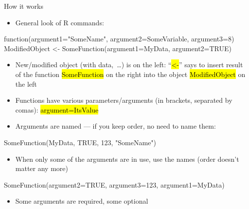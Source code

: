 \documentclass[compress, ucs, xelatex, 11pt, xcolor=svgnames,
	hyperref={
		bookmarks=true,
		unicode=true,
		colorlinks=true,
		pdftitle={Molecular data in R},
		plainpages=false,
		pdfauthor={Vojtech Zeisek},
		pdfsubject={Course about phylogeny and evolution in R},
		pdfcreator={XeLaTeX},
		pdfkeywords={R, evolution, phylogeny, molecular data},
		linkcolor=Tomato,
		anchorcolor=SaddleBrown,
		citecolor=Goldenrod,
		filecolor=DarkMagenta,
		menucolor=Sienna,
		urlcolor=DarkTurquoise,
		pdftex},
	url={hyphens, lowtilde} %
	]{beamer}
\renewcommand{\texttt}[1]{\hl{\ttfamily #1}}
\begin{document}
\begin{frame}[fragile]{How it works}
	\begin{itemize}
		\item General look of R commands:
	\end{itemize}
	\begin{spluscode}
    function(argument1="SomeName", argument2=SomeVariable, argument3=8)
    ModifiedObject <- SomeFunction(argument1=MyData, argument2=TRUE)
	\end{spluscode}
	\begin{itemize}
		\item New/modified object (with data,~\ldots) is on the left: ``\texttt{<-}'' says to insert result of the function \texttt{SomeFunction} on the right into the object \texttt{ModifiedObject} on the left
		\item Functions have various parameters/arguments (in brackets, separated by comas): \texttt{argument=ItsValue}
		\item Arguments are named --- if you keep order, no need to name them:
	\end{itemize}
	\begin{spluscode}
    SomeFunction(MyData, TRUE, 123, "SomeName")
	\end{spluscode}
	\begin{itemize}
		\item When only some of the arguments are in use, use the names (order doesn't matter any more)
	\end{itemize}
	\begin{spluscode}
    SomeFunction(argument2=TRUE, argument3=123, argument1=MyData)
	\end{spluscode}
	\begin{itemize}
		\item Some arguments are required, some optional
	\end{itemize}
\end{frame}
\end{document}
